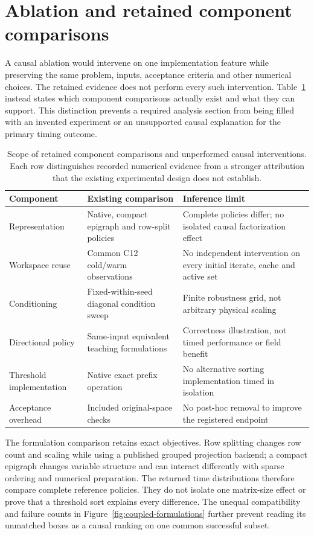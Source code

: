 \section{Ablation and retained component comparisons}\label{sec:ablation}
A causal ablation would intervene on one implementation feature
while preserving the same problem, inputs, acceptance criteria and
other numerical choices. The retained evidence does not perform
every such intervention. Table~\ref{tab:ablation} instead states
which component comparisons actually exist and what they can
support. This distinction prevents a required analysis section
from being filled with an invented experiment or an unsupported
causal explanation for the primary timing outcome.

\begin{table}[htbp]\centering\small
\caption{Scope of retained component comparisons and unperformed causal interventions. Each row distinguishes recorded numerical evidence from a stronger attribution that the existing experimental design does not establish.}\label{tab:ablation}
\begin{tabularx}{\textwidth}{@{}lXX@{}}\toprule
Component & Existing comparison & Inference limit\\\midrule
Representation & Native, compact epigraph and row-split policies & Complete policies differ; no isolated causal factorization effect\\
Workspace reuse & Common C12 cold/warm observations & No independent intervention on every initial iterate, cache and active set\\
Conditioning & Fixed-within-seed diagonal condition sweep & Finite robustness grid, not arbitrary physical scaling\\
Directional policy & Same-input equivalent teaching formulations & Correctness illustration, not timed performance or field benefit\\
Threshold implementation & Native exact prefix operation & No alternative sorting implementation timed in isolation\\
Acceptance overhead & Included original-space checks & No post-hoc removal to improve the registered endpoint\\\bottomrule
\end{tabularx}
\end{table}

The formulation comparison retains exact objectives. Row splitting
changes row count and scaling while using a published grouped
projection backend; a compact epigraph changes variable structure
and can interact differently with sparse ordering and numerical
preparation. The returned time distributions therefore compare
complete reference policies. They do not isolate one matrix-size
effect or prove that a threshold sort explains every difference.
The unequal compatibility and failure counts in
Figure~\ref{fig:coupled-formulations} further prevent reading its
unmatched boxes as a causal ranking on one common successful subset.


